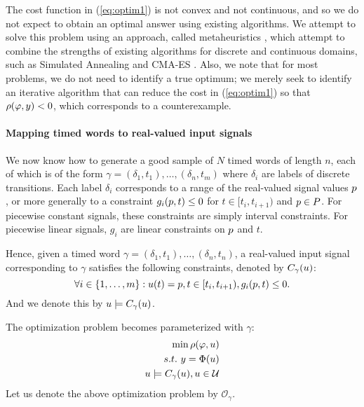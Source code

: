 The cost function in (\ref{eq:optim1}) is not convex and not continuous, and so we do not expect to obtain an optimal answer using existing algorithms. We attempt to solve this problem using an approach, called metaheuristics \cite{dreo:hal-01341683}, which attempt to combine the strengths of existing algorithms for discrete and continuous domains, such as Simulated Annealing \cite{Kirkpatrick83optimizationby} and CMA-ES \cite{hansen2006eda}. Also, we note that for most problems, we do not need to identify a true optimum; we merely seek to identify an iterative algorithm that can reduce the cost in (\ref{eq:optim1}) so that $\rho(\varphi,y)<0$, which corresponds to a counterexample.

\paragraph{Mapping timed words to real-valued input signals}\label{sec:KS}\label{sec:backward}
We now know how to generate a good sample of $N$ timed words of length $n$, each of which is of the form $\gamma = (\delta_1, t_1), \ldots, (\delta_n, t_m)$ where $\delta_i$ are labels of discrete transitions. Each label $\delta_i$ corresponds to a range of the real-valued signal values $p$, or more generally to a constraint $g_i(p, t) \le 0$ for $t \in [t_i, t_{i+1})$ and $p \in P$. For piecewise constant signals, these constraints are simply interval constraints. For piecewise linear signals, $g_i$ are linear constraints on $p$ and $t$. 

Hence, given a timed word $\gamma = (\delta_1, t_1), \ldots, (\delta_n, t_n)$, a real-valued input signal corresponding to $\gamma$ satisfies the following constraints, denoted by $C_{\gamma}(u)$:
$$\forall i \in \{1, \ldots, m \}: u (t)= p, t \in [t_i, t_{i+1}), g_i(p,t)  \le 0.$$
And we denote this by $u \models C_{\gamma}(u)$.

The optimization problem becomes parameterized with $\gamma$:
\begin{eqnarray} \label{eq:optim2}
\min \rho(\varphi, u) \\ \nonumber
s.t. ~y=\Phi(u) \\ \nonumber
u \models C_{\gamma}(u), u \in \mathcal{U} \nonumber
\end{eqnarray}
Let us denote the above optimization problem by $\mathcal{O}_{\gamma}$.

